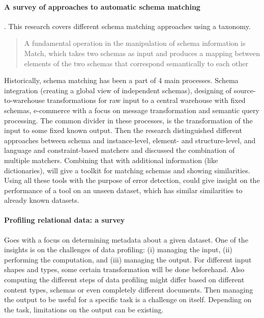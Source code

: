 \paragraph{A survey of approaches to automatic schema matching \cite{Rahm2001-ei}}. This research covers different schema matching approaches using a taxonomy. 
\blockquote{A fundamental operation in the manipulation of schema information is Match, which takes two schemas as input and produces a mapping between elements of the two schemas that correspond semantically to each other}
Historically, schema matching has been a part of 4 main processes. Schema integration (creating a global view of independent schemas), designing of source-to-warehouse transformations for raw input to a central warehouse with fixed schemas, e-commerce with a focus on message transformation and semantic query processing. 
The common divider in these processes, is the transformation of the input to some fixed known output.  
Then the research distinguished different approaches between schema and instance-level, element- and structure-level, and language and constraint-based matchers and discussed the combination of multiple matchers. Combining that with additional information (like dictionaries), will give a toolkit for matching schemas and showing similarities. 
Using all these tools with the purpose of error detection, could give insight on the performance of a tool on an unseen dataset, which has similar similarities to already known datasets.

\paragraph{Profiling relational data: a survey \cite{Abedjan2015-ul}} 
Goes with a focus on determining metadata about a given dataset. One of the insights is on the challenges of data profiling: (i) managing the input, (ii) performing the computation, and (iii) managing the output. For different input shapes and types, some certain transformation will be done beforehand. Also computing the different steps of data profiling might differ based on different content types, schemas or even completely different documents. Then managing the output to be useful for a specific task is a challenge on itself. Depending on the task, limitations on the output can be existing. 




